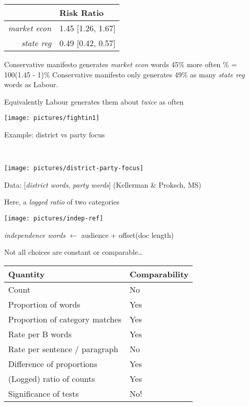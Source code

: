 \documentclass{mediumfoils}
\begin{document}
\begin{center}
\begin{tabular}{rl} \toprule
 & Risk Ratio\\ \midrule
\textsl{market econ} & 1.45 [1.26, 1.67]\\ 
\textsl{state reg} & 0.49 [0.42, 0.57] \\ \bottomrule
\end{tabular} 
\end{center}

 Conservative manifesto generates \textsl{market econ} words 45\% more often 
\ita
{}\% = 100(1.45 - 1)\% 
\itz
Conservative manifesto only generates 49\% as many \textsl{state reg} words as Labour.  

Equivalently Labour generates them about \textsl{twice} as often


\centerline{\texttt{[image: pictures/fightin1]}}






Example: district vs party focus

~\\
\centerline{\texttt{[image: pictures/district-party-focus]}}

Data: [\textsl{district words}, \textsl{party words}] (Kellerman \& Proksch, MS)

Here, a \textit{logged ratio} of two categories


\centerline{\texttt{[image: pictures/indep-ref]}}

\textsl{independence words} $\leftarrow$ audience + offset(doc length)


Not all choices are constant or comparable\ldots

{\small
\begin{center}
\begin{tabular}{ll} \toprule
Quantity & Comparability\\ \midrule
Count & No \\
Proportion of words & Yes\\
Proportion of category matches & Yes\\
Rate per B words & Yes\\ 
Rate per sentence / paragraph & No\\
Difference of proportions & Yes\\
(Logged) ratio of counts & Yes\\ 
Significance of tests & No!\\
\bottomrule
\end{tabular}
\end{center}
\normalsize}
\end{document}
